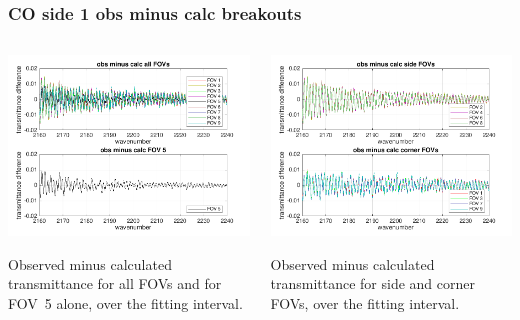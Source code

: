 \documentclass[10pt]{beamer}
\begin{document}
\begin{frame}
\frametitle{CO side 1 obs minus calc breakouts}
\begin{columns}[t]
\begin{column}{0.5\textwidth}
  \begin{centering}
  \includegraphics[width=\textwidth]{01-08_pfl_s1_CO/CO_breakout_1.png}
  \end{centering}\vspace{3mm}

Observed minus calculated transmittance for all FOVs and for FOV~5
alone, over the fitting interval.

\end{column}
\begin{column}{0.5\textwidth}  
  \begin{centering}
  \includegraphics[width=\textwidth]{01-08_pfl_s1_CO/CO_breakout_2.png}
  \end{centering}\vspace{3mm}

Observed minus calculated transmittance for side and corner FOVs,
over the fitting interval.

\end{column}
\end{columns}
\end{frame}
\end{document}
